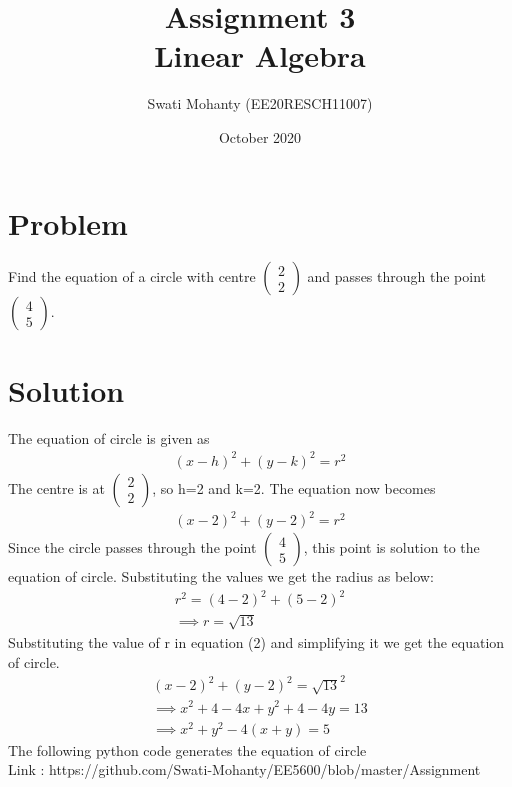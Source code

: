 \documentclass[journal,12pt,twocolumn]{IEEEtran}
\title{Assignment 3
\\Linear Algebra }
\author{Swati Mohanty (EE20RESCH11007) }
\date{October 2020}
\newcommand{\myvec}[1]{\ensuremath{\begin{pmatrix}#1\end{pmatrix}}}
\begin{document}
\maketitle


\section{Problem}
Find the equation of a circle with centre \myvec{2\\2} and passes through the point \myvec{4\\5}.
\section{Solution}
The equation of circle is given as
\begin{align}
    (x-h)^2 + (y-k)^2 = r^2
\end{align}
The centre is at \myvec{2\\2}, so h=2 and k=2. The equation now becomes
\begin{align}
    (x-2)^2 + (y-2)^2 = r^2
\end{align}
Since the circle passes through the point \myvec{4\\5}, this point is solution to the equation of circle. Substituting the values we get the radius as below:
\begin{align}
    r^2 = (4-2)^2 + (5-2)^2 
    \\\implies r = \sqrt{13}
\end{align}
Substituting the value of r in equation (2) and simplifying it we get the equation of circle.
\begin{align}
    (x-2)^2 + (y-2)^2 = \sqrt{13}^2
    \\\implies x^2 + 4 - 4x + y^2 + 4 - 4y = 13
    \\\implies x^2 + y^2 - 4(x+y) = 5
\end{align}
The following python code generates the equation of circle
\\Link : https://github.com/Swati-Mohanty/EE5600/blob/master/Assignment%
\end{document}
